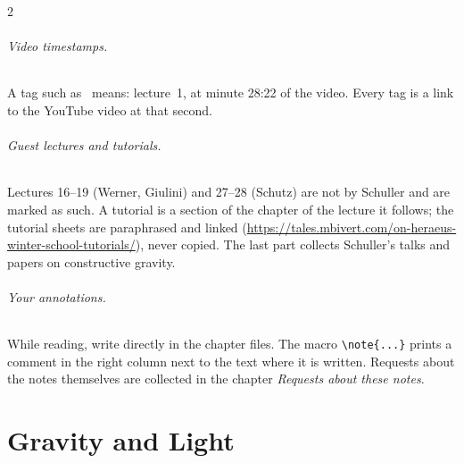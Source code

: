 \documentclass[12pt,oneside,openany]{book}
\begin{document}
\begin{paracol}{2}
\paragraph{Video timestamps.} A tag such as \ means: lecture~1, at minute 28:22 of the
video. Every tag is a link to the YouTube video at that second.

\paragraph{Guest lectures and tutorials.} Lectures 16--19 (Werner, Giulini) and 27--28 (Schutz) are not by Schuller and are marked as such. A tutorial is a section of the chapter of the lecture it follows; the tutorial sheets are paraphrased and linked (\url{https://tales.mbivert.com/on-heraeus-winter-school-tutorials/}), never copied. The last part collects Schuller's talks and papers on constructive gravity.

\paragraph{Your annotations.} While reading, write directly in the chapter files. The macro
\verb|\note{...}| prints a comment in the right column next to the text where it is written. Requests
about the notes themselves are collected in the chapter \emph{Requests about these notes}.

\flushside
\end{paracol}



\tableofcontents

\mainmatter
\mainmatter
\part{Gravity and Light}




























\end{document}
